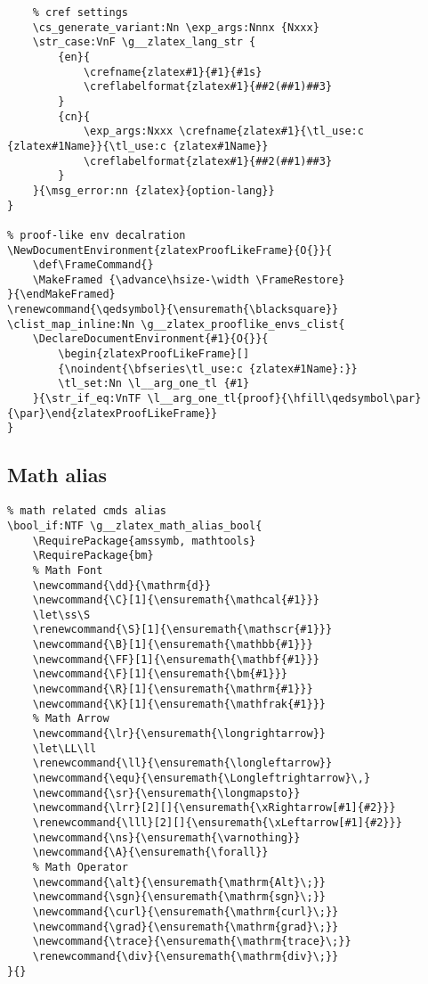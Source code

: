 \begin{verbatim}
    % cref settings
    \cs_generate_variant:Nn \exp_args:Nnnx {Nxxx}
    \str_case:VnF \g__zlatex_lang_str {
        {en}{
            \crefname{zlatex#1}{#1}{#1s}
            \creflabelformat{zlatex#1}{##2(##1)##3}
        }
        {cn}{
            \exp_args:Nxxx \crefname{zlatex#1}{\tl_use:c {zlatex#1Name}}{\tl_use:c {zlatex#1Name}}
            \creflabelformat{zlatex#1}{##2(##1)##3}
        }
    }{\msg_error:nn {zlatex}{option-lang}}
}

% proof-like env decalration
\NewDocumentEnvironment{zlatexProofLikeFrame}{O{}}{
    \def\FrameCommand{}
    \MakeFramed {\advance\hsize-\width \FrameRestore}
}{\endMakeFramed}
\renewcommand{\qedsymbol}{\ensuremath{\blacksquare}}
\clist_map_inline:Nn \g__zlatex_prooflike_envs_clist{
    \DeclareDocumentEnvironment{#1}{O{}}{
        \begin{zlatexProofLikeFrame}[]
        {\noindent{\bfseries\tl_use:c {zlatex#1Name}:}}
        \tl_set:Nn \l__arg_one_tl {#1}
    }{\str_if_eq:VnTF \l__arg_one_tl{proof}{\hfill\qedsymbol\par}{\par}\end{zlatexProofLikeFrame}}
}
\end{verbatim}

\subsection{Math alias}
\begin{verbatim}
% math related cmds alias
\bool_if:NTF \g__zlatex_math_alias_bool{
    \RequirePackage{amssymb, mathtools}
    \RequirePackage{bm}          
    % Math Font 
    \newcommand{\dd}{\mathrm{d}}
    \newcommand{\C}[1]{\ensuremath{\mathcal{#1}}}
    \let\ss\S
    \renewcommand{\S}[1]{\ensuremath{\mathscr{#1}}}
    \newcommand{\B}[1]{\ensuremath{\mathbb{#1}}}
    \newcommand{\FF}[1]{\ensuremath{\mathbf{#1}}}
    \newcommand{\F}[1]{\ensuremath{\bm{#1}}}
    \newcommand{\R}[1]{\ensuremath{\mathrm{#1}}}
    \newcommand{\K}[1]{\ensuremath{\mathfrak{#1}}}
    % Math Arrow 
    \newcommand{\lr}{\ensuremath{\longrightarrow}}
    \let\LL\ll
    \renewcommand{\ll}{\ensuremath{\longleftarrow}}
    \newcommand{\equ}{\ensuremath{\Longleftrightarrow}\,}
    \newcommand{\sr}{\ensuremath{\longmapsto}}
    \newcommand{\lrr}[2][]{\ensuremath{\xRightarrow[#1]{#2}}}
    \renewcommand{\lll}[2][]{\ensuremath{\xLeftarrow[#1]{#2}}}
    \newcommand{\ns}{\ensuremath{\varnothing}}
    \newcommand{\A}{\ensuremath{\forall}}
    % Math Operator
    \newcommand{\alt}{\ensuremath{\mathrm{Alt}\;}}
    \newcommand{\sgn}{\ensuremath{\mathrm{sgn}\;}}
    \newcommand{\curl}{\ensuremath{\mathrm{curl}\;}}
    \newcommand{\grad}{\ensuremath{\mathrm{grad}\;}}
    \newcommand{\trace}{\ensuremath{\mathrm{trace}\;}}
    \renewcommand{\div}{\ensuremath{\mathrm{div}\;}}
}{}
\end{verbatim}

